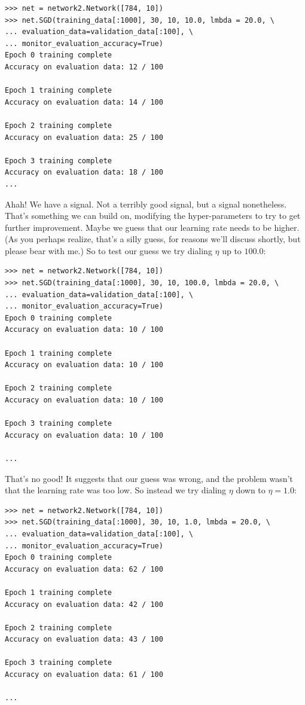 \begin{lstlisting}
>>> net = network2.Network([784, 10])
>>> net.SGD(training_data[:1000], 30, 10, 10.0, lmbda = 20.0, \
... evaluation_data=validation_data[:100], \
... monitor_evaluation_accuracy=True)
Epoch 0 training complete
Accuracy on evaluation data: 12 / 100

Epoch 1 training complete
Accuracy on evaluation data: 14 / 100

Epoch 2 training complete
Accuracy on evaluation data: 25 / 100

Epoch 3 training complete
Accuracy on evaluation data: 18 / 100
...

\end{lstlisting}


Ahah! We have a signal. Not a terribly good signal, but a signal nonetheless. That's something we can build on, modifying the hyper-parameters to try to get further improvement. Maybe we guess that our learning rate needs to be higher. (As you perhaps realize, that's a silly guess, for reasons we'll discuss shortly, but please bear with me.) So to test our guess we try dialing $\eta$ up to $100.0$:



\begin{lstlisting}
>>> net = network2.Network([784, 10])
>>> net.SGD(training_data[:1000], 30, 10, 100.0, lmbda = 20.0, \
... evaluation_data=validation_data[:100], \
... monitor_evaluation_accuracy=True)
Epoch 0 training complete
Accuracy on evaluation data: 10 / 100

Epoch 1 training complete
Accuracy on evaluation data: 10 / 100

Epoch 2 training complete
Accuracy on evaluation data: 10 / 100

Epoch 3 training complete
Accuracy on evaluation data: 10 / 100

...

\end{lstlisting}


That's no good! It suggests that our guess was wrong, and the problem wasn't that the learning rate was too low. So instead we try dialing $\eta$ down to $\eta = 1.0$:



\begin{lstlisting}
>>> net = network2.Network([784, 10])
>>> net.SGD(training_data[:1000], 30, 10, 1.0, lmbda = 20.0, \
... evaluation_data=validation_data[:100], \
... monitor_evaluation_accuracy=True)
Epoch 0 training complete
Accuracy on evaluation data: 62 / 100

Epoch 1 training complete
Accuracy on evaluation data: 42 / 100

Epoch 2 training complete
Accuracy on evaluation data: 43 / 100

Epoch 3 training complete
Accuracy on evaluation data: 61 / 100

...

\end{lstlisting}



